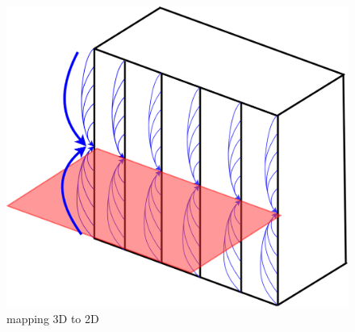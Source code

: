 \begin{frame}

\begin{figure}
\includegraphics[scale=0.5]{./Resources/Images/mapping32.png}%
\caption{mapping 3D to 2D}
\end{figure}

\end{frame}


